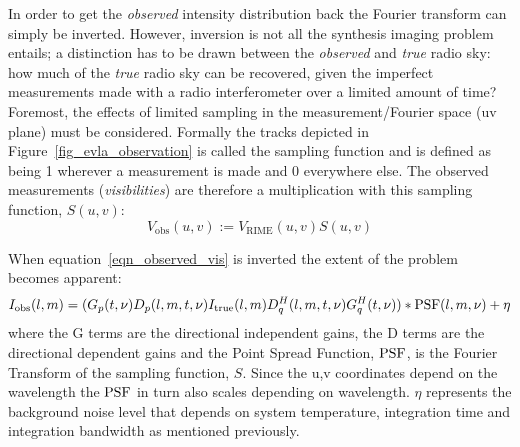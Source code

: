 In order to get the \emph{observed} intensity distribution back the Fourier transform can simply be inverted. However, inversion is not all the synthesis imaging problem entails; a distinction has to be drawn
between the \emph{observed} and \emph{true} radio sky: how much of the \emph{true} radio sky can be recovered, given the imperfect measurements made with a radio interferometer over a limited amount of time? Foremost, the
effects of limited sampling in the measurement/Fourier space (uv plane) must be considered. Formally the tracks depicted in Figure~\ref{fig_evla_observation} is called the sampling function and is defined as being 1 wherever 
a measurement is made and 0 everywhere else. The observed measurements (\emph{visibilities}) are therefore a multiplication with this sampling function, $S(u,v)$:
\begin{equation}
 V_{\text{obs}}(u,v) := V_{\text{RIME}}(u,v)S(u,v)
 \label{eqn_observed_vis}
\end{equation}

When equation~\ref{eqn_observed_vis} is inverted the extent of the problem becomes apparent:
\begin{equation}
 I_{\text{obs}}(l,m) = (G_p(t,\nu)D_p(l,m,t,\nu)I_{\text{true}}(l,m)D_q^H(l,m,t,\nu)G_q^H(t,\nu))*\textrm{PSF}{(l,m,\nu)} + \eta
\end{equation}
where the G terms are the directional independent gains, the D terms are the directional dependent gains and the Point Spread Function, $\textrm{PSF}$, is the Fourier Transform of the sampling function, $S$. Since
the u,v coordinates depend on the wavelength the $\textrm{PSF}$ in turn also scales depending on wavelength. $\eta$ represents the background noise level that depends on system temperature, integration time and integration
bandwidth as mentioned previously.

